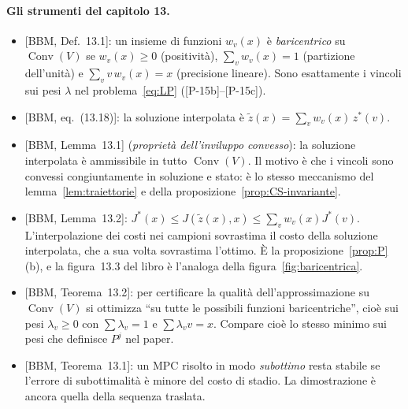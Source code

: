 \documentclass[11pt,a4paper]{article}
\theoremstyle{definition}
\theoremstyle{plain}
\theoremstyle{remark}
\DeclareMathOperator{\Conv}{Conv}
\newcommand{\eqp}[1]{\textup{[P-#1]}}   %
\newcommand{\libro}[1]{\textup{[BBM, #1]}} %
\begin{document}
\paragraph{Gli strumenti del capitolo 13.}
\begin{itemize}
  \item \libro{Def.~13.1}: un insieme di funzioni $w_v(x)$ è
        \emph{baricentrico} su $\Conv(V)$ se $w_v(x)\ge 0$ (positività),
        $\sum_v w_v(x)=1$ (partizione dell'unità) e $\sum_v v\,w_v(x)=x$
        (precisione lineare). Sono esattamente i vincoli sui pesi $\lambda$
        nel problema~\eqref{eq:LP} (\eqp{15b}--\eqp{15c}).
  \item \libro{eq.~(13.18)}: la soluzione interpolata è
        $\tilde z(x)=\sum_v w_v(x)\,z^*(v)$.
  \item \libro{Lemma~13.1} (\emph{proprietà dell'inviluppo convesso}): la
        soluzione interpolata è ammissibile in tutto $\Conv(V)$. Il motivo è
        che i vincoli sono convessi congiuntamente in soluzione e stato: è lo
        stesso meccanismo del lemma~\ref{lem:traiettorie} e della
        proposizione~\ref{prop:CS-invariante}.
  \item \libro{Lemma~13.2}:
        $J^*(x)\le J(\tilde z(x),x)\le\sum_v w_v(x)J^*(v)$. L'interpolazione
        dei costi nei campioni sovrastima il costo della soluzione
        interpolata, che a sua volta sovrastima l'ottimo. È la
        proposizione~\ref{prop:P}(b), e la figura~13.3 del libro è
        l'analoga della figura~\ref{fig:baricentrica}.
  \item \libro{Teorema~13.2}: per certificare la qualità
        dell'approssimazione su $\Conv(V)$ si ottimizza ``su tutte le
        possibili funzioni baricentriche'', cioè sui pesi $\lambda_v\ge 0$
        con $\sum\lambda_v=1$ e $\sum\lambda_v v=x$. Compare cioè lo stesso
        minimo sui pesi che definisce $P^j$ nel paper.
  \item \libro{Teorema~13.1}: un MPC risolto in modo \emph{subottimo} resta
        stabile se l'errore di subottimalità è minore del costo di stadio. La
        dimostrazione è ancora quella della sequenza traslata.
\end{itemize}
\end{document}
